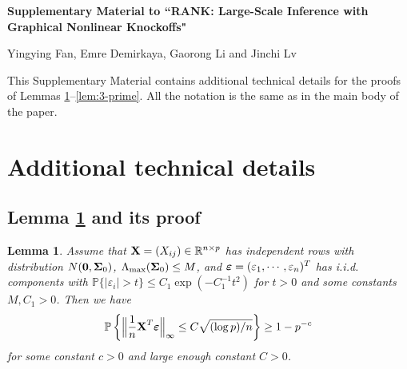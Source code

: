 \documentclass[11pt]{article}
\newtheorem{lemma}{Lemma}%
\renewcommand{\theequation}{%
\arabic{equation}%
}
\newcommand{\bX}{\mbox{\bf X}}
\newcommand{\bzero}{\mbox{\bf 0}}
\newcommand{\bveps}{\mbox{\boldmath $\varepsilon$}}
\newcommand{\bSig}{\mbox{\boldmath $\Sigma$}}
\newcommand{\veps}{\varepsilon}
\begin{document}

\newpage
\appendix
\setcounter{page}{1}
\setcounter{section}{1}
\renewcommand{\theequation}{A.\arabic{equation}}
\renewcommand{\thesubsection}{B.\arabic{subsection}}
\setcounter{equation}{0}

\begin{center}{\bf \Large Supplementary Material to ``RANK: Large-Scale Inference with Graphical Nonlinear Knockoffs"}

\bigskip

Yingying Fan, Emre Demirkaya, Gaorong Li and Jinchi Lv
\end{center}

\noindent This Supplementary Material contains additional technical details for the proofs of Lemmas \ref{error-lem}--\ref{lem:3-prime}. All the notation is the same as in the main body of the paper.


\section{Additional technical details} \label{appB}

\subsection{Lemma \ref{error-lem} and its proof} \label{appB.1}

\begin{lemma}\label{error-lem}
Assume that $\bX = (X_{ij})\in \mathbb{R}^{n\times p}$ has independent rows with distribution $N(\bzero, \bSig_0)$, $\Lambda_{\max}(\bSig_0) \leq M $, and $\bveps = (\veps_1,\cdots, \veps_n)^T$ has i.i.d. components with $ \mathbb{P} \{ | \veps _{i} | > t \} \leq C_{1} \exp ( -C_{1}^{-1} t^{2} )$ for $t > 0$ and some constants $M, C_{1} > 0$.
Then we have
\begin{eqnarray*}
\mathbb{P}\left\{\Big\|\frac{1}{n}{\bX}^T\bveps\Big\|_{\infty}\le C\sqrt{(\log p)/n}\right\}\geq 1- p^{-c}
\end{eqnarray*}
for some constant $c > 0$ and large enough constant $C > 0$.
\end{lemma}
\end{document}
